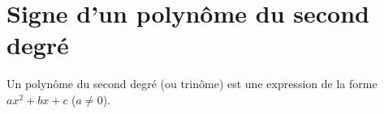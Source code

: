 \documentclass[12pt,a4paper]{article}
\begin{document}


\section{Signe d'un polynôme du second degré}

\begin{mydef}
	Un polynôme du second degré (ou trinôme) est une expression de la forme $ax^2+bx+c$ ($a \neq 0$).
\end{mydef}
\end{document}
